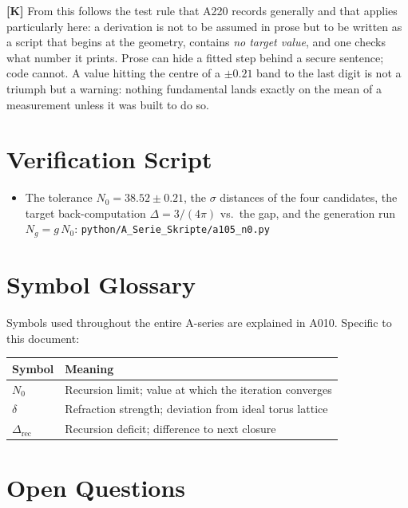 \textbf{[K]} From this follows the test rule that A220 records generally and that
applies particularly here: a derivation is not to be assumed in prose but to be
written as a script that begins at the geometry, contains \emph{no target value},
and one checks what number it prints. Prose can hide a fitted step behind a secure
sentence; code cannot. A value hitting the centre of a $\pm 0{.}21$ band to the
last digit is not a triumph but a warning: nothing fundamental lands exactly on
the mean of a measurement unless it was built to do so.

\section{Verification Script}

\begin{itemize}
  \item The tolerance $N_0 = 38{.}52 \pm 0{.}21$, the $\sigma$ distances of the
    four candidates, the target back-computation $\Delta = 3/(4\pi)$ vs.\ the gap,
    and the generation run $N_g = g\,N_0$:
    \texttt{python/A\_Serie\_Skripte/a105\_n0.py}
\end{itemize}

\section{Symbol Glossary}

Symbols used throughout the entire A-series are explained in A010.
Specific to this document:

\begin{center}
\renewcommand{\arraystretch}{1.3}
{\small\begin{tabular}{lp{9cm}}
\toprule
Symbol & Meaning \\
\midrule
$N_0$ & Recursion limit; value at which the iteration converges \\
$\delta$ & Refraction strength; deviation from ideal torus lattice \\
$\Delta_\text{rec}$ & Recursion deficit; difference to next closure \\
\bottomrule
\end{tabular}}
\renewcommand{\arraystretch}{1.0}
\end{center}

\section{Open Questions}


